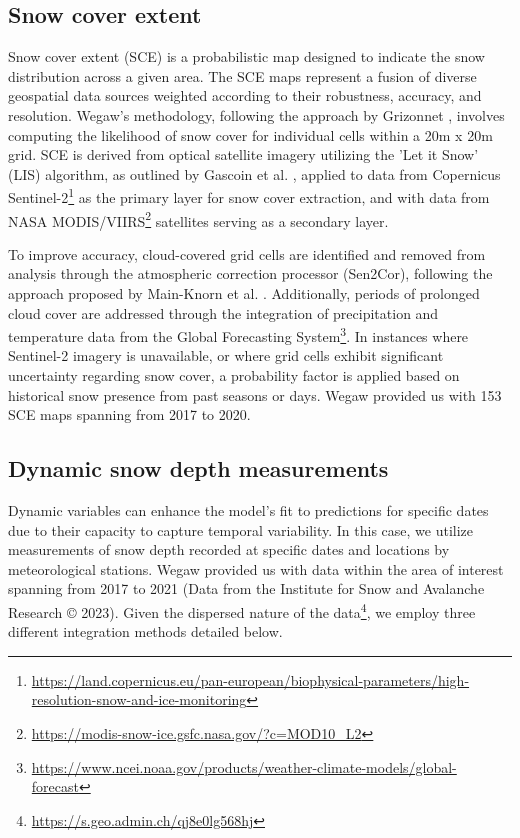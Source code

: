 \documentclass[preprint,12pt]{elsarticle}
\begin{document}
\subsection{Snow cover extent}

Snow cover extent (SCE) is a probabilistic map designed to indicate the snow distribution across a given area. The SCE maps %
represent a fusion of diverse geospatial data sources weighted according to their robustness, accuracy, and resolution. Wegaw's methodology, following the approach by Grizonnet \cite{grizonnet2017operational}, involves computing the likelihood of snow cover for individual cells within a 20m x 20m grid. SCE is derived from optical satellite imagery utilizing the 'Let it Snow' (LIS) algorithm, as outlined by Gascoin et al. \cite{Gascoin2019}, applied to data from Copernicus Sentinel-2\footnote{\url{https://land.copernicus.eu/pan-european/biophysical-parameters/high-resolution-snow-and-ice-monitoring}}  as the primary layer for snow cover extraction, and with data from NASA MODIS/VIIRS\footnote{\url{https://modis-snow-ice.gsfc.nasa.gov/?c=MOD10_L2}} satellites serving as a secondary layer. 

To improve accuracy, cloud-covered grid cells are identified and removed from analysis through the atmospheric correction processor (Sen2Cor), following the approach proposed by Main-Knorn et al. \cite{Main-Knorn2017}. Additionally, periods of prolonged cloud cover are addressed through the integration of precipitation and temperature data from the Global Forecasting System\footnote{\url{https://www.ncei.noaa.gov/products/weather-climate-models/global-forecast}}. In instances where Sentinel-2 imagery is unavailable, or where grid cells exhibit significant uncertainty regarding snow cover, a probability factor is applied based on historical snow presence from past seasons or days. Wegaw provided us with 153 SCE maps spanning from 2017 to 2020.

\subsection{Dynamic snow depth measurements}
\label{subsec:temporalvars}

Dynamic variables can enhance the model's fit to predictions for specific dates due to their capacity to capture temporal variability. In this case, we utilize measurements of snow depth recorded at specific dates and locations by meteorological stations. Wegaw provided us with data within the area of interest spanning from 2017 to 2021 (Data from the Institute for Snow and Avalanche Research © 2023). Given the dispersed nature of the data\footnote{\url{https://s.geo.admin.ch/qj8e0lg568hj}}, we employ three different integration methods detailed below.
\end{document}
